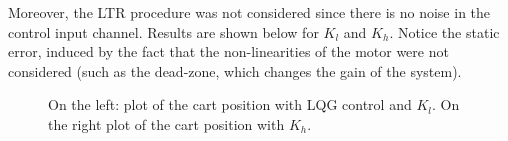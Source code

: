 Moreover, the LTR procedure was not considered since there is no noise in the control input channel.
Results are shown below for $K_l$ and $K_h$. Notice the static error, induced by the fact that the non-linearities of the motor were not considered (such as the dead-zone, which changes the gain of the system).
  \begin{figure}[!tbh]
  \centering
  \hspace{1cm}
  \caption{On the left: plot of the cart position with LQG control and $K_l$. On the right plot of the cart position with $K_h$.}
    \label{fig:lqg1dof}
\end{figure}